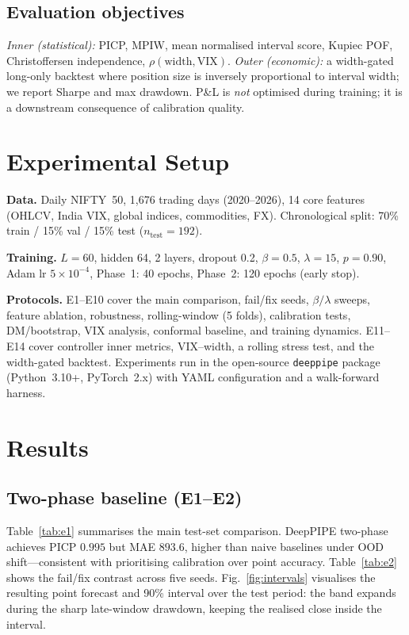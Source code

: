 \documentclass[conference]{IEEEtran}
\begin{document}
\subsection{Evaluation objectives}
\emph{Inner (statistical):} PICP, MPIW, mean normalised interval score, Kupiec POF, Christoffersen
independence, $\rho(\mathrm{width},\mathrm{VIX})$. \emph{Outer (economic):} a width-gated
long-only backtest where position size is inversely proportional to interval width; we report
Sharpe and max drawdown. P\&L is \emph{not} optimised during training; it is a downstream
consequence of calibration quality.

\section{Experimental Setup}
\label{sec:experiments}
\textbf{Data.} Daily NIFTY~50, 1{,}676 trading days (2020--2026), 14 core features (OHLCV, India
VIX, global indices, commodities, FX). Chronological split: 70\% train / 15\% val / 15\% test
($n_{\mathrm{test}}=192$).

\textbf{Training.} $L{=}60$, hidden 64, 2 layers, dropout 0.2, $\beta{=}0.5$, $\lambda{=}15$,
$p{=}0.90$, Adam lr $5{\times}10^{-4}$, Phase~1: 40 epochs, Phase~2: 120 epochs (early stop).

\textbf{Protocols.} E1--E10 cover the main comparison, fail/fix seeds, $\beta/\lambda$ sweeps,
feature ablation, robustness, rolling-window (5 folds), calibration tests, DM/bootstrap, VIX
analysis, conformal baseline, and training dynamics. E11--E14 cover controller inner metrics,
VIX--width, a rolling stress test, and the width-gated backtest. Experiments run in the
open-source \texttt{deeppipe} package (Python~3.10+, PyTorch~2.x) with YAML configuration and a
walk-forward harness.

\section{Results}
\label{sec:results}
\subsection{Two-phase baseline (E1--E2)}
Table~\ref{tab:e1} summarises the main test-set comparison. DeepPIPE two-phase achieves PICP
$0.995$ but MAE $893.6$, higher than naive baselines under OOD shift---consistent with
prioritising calibration over point accuracy. Table~\ref{tab:e2} shows the fail/fix contrast
across five seeds. Fig.~\ref{fig:intervals} visualises the resulting point forecast and 90\%
interval over the test period: the band expands during the sharp late-window drawdown, keeping
the realised close inside the interval.
\end{document}
